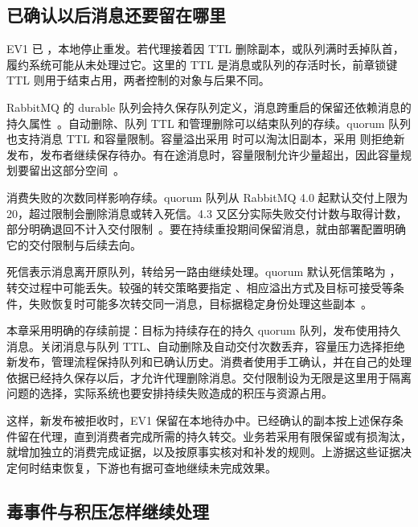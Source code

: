 \subsection*{已确认以后消息还要留在哪里}

EV1 已 ，本地停止重发。若代理接着因 TTL 删除副本，或队列满时丢掉队首，履约系统可能从未处理过它。这里的 TTL 是消息或队列的存活时长，前章锁键 TTL 则用于结束占用，两者控制的对象与后果不同。

RabbitMQ 的 durable 队列会持久保存队列定义，消息跨重启的保留还依赖消息的持久属性~\cite{rabbitmq-queues}。自动删除、队列 TTL 和管理删除可以结束队列的存续。quorum 队列也支持消息 TTL 和容量限制。容量溢出采用  时可以淘汰旧副本，采用  则拒绝新发布，发布者继续保存待办。有在途消息时，容量限制允许少量超出，因此容量规划要留出这部分空间~\cite{rabbitmq-quorum-queues}。

消费失败的次数同样影响存续。quorum 队列从 RabbitMQ 4.0 起默认交付上限为 20，超过限制会删除消息或转入死信。4.3 又区分实际失败交付计数与取得计数，部分明确退回不计入交付限制~\cite{rabbitmq-quorum-queues}。要在持续重投期间保留消息，就由部署配置明确它的交付限制与后续去向。

死信表示消息离开原队列，转给另一路由继续处理。quorum 默认死信策略为 ，转交过程中可能丢失。较强的转交策略要指定 、相应溢出方式及目标可接受等条件，失败恢复时可能多次转交同一消息，目标据稳定身份处理这些副本~\cite{rabbitmq-quorum-queues}。

本章采用明确的存续前提：目标为持续存在的持久 quorum 队列，发布使用持久消息。关闭消息与队列 TTL、自动删除及自动交付次数丢弃，容量压力选择拒绝新发布，管理流程保持队列和已确认历史。消费者使用手工确认，并在自己的处理依据已经持久保存以后，才允许代理删除消息。交付限制设为无限是这里用于隔离问题的选择，实际系统也要安排持续失败造成的积压与资源占用。

这样，新发布被拒收时，EV1 保留在本地待办中。已经确认的副本按上述保存条件留在代理，直到消费者完成所需的持久转交。业务若采用有限保留或有损淘汰，就增加独立的消费完成证据，以及按原事实核对和补发的规则。上游据这些证据决定何时结束恢复，下游也有据可查地继续未完成效果。


\subsection*{毒事件与积压怎样继续处理}

